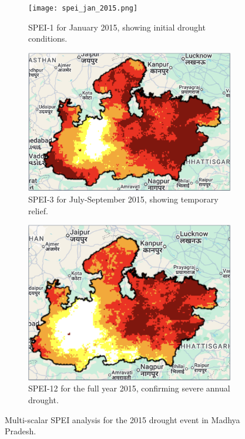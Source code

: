 \documentclass[12pt, a4paper]{article}
\begin{document}
\begin{figure}[h!]
    \centering
    \begin{subfigure}[b]{0.48\textwidth}
        \centering
        \texttt{[image: spei\_jan\_2015.png]}
        \caption{SPEI-1 for January 2015, showing initial drought conditions.}
        \label{fig:2015_jan}
    \end{subfigure}
    \hfill
    \begin{subfigure}[b]{0.48\textwidth}
        \centering
        \includegraphics[width=\textwidth]{spei_jul-sep_2015.png}
        \caption{SPEI-3 for July-September 2015, showing temporary relief.}
        \label{fig:2015_season3}
    \end{subfigure}
    
    \vspace{1cm} %
    
    \begin{subfigure}[b]{0.6\textwidth}
        \centering
        \includegraphics[width=\textwidth]{spei_annual_2015.png}
        \caption{SPEI-12 for the full year 2015, confirming severe annual drought.}
        \label{fig:2015_annual}
    \end{subfigure}
    \caption{Multi-scalar SPEI analysis for the 2015 drought event in Madhya Pradesh.}
    \label{fig:2015_results}
\end{figure}
\end{document}
